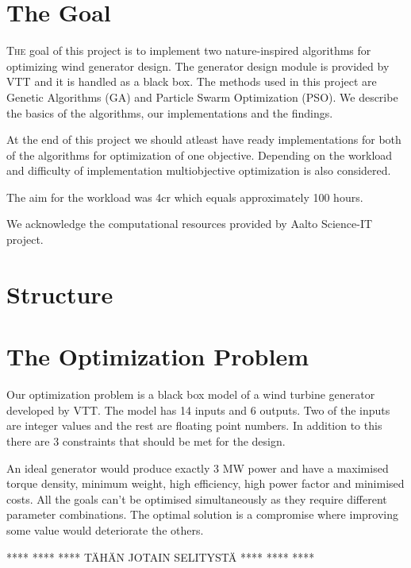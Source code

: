 \documentclass[twoside]{article}
\begin{document}
\begin{multicols}{2} %

\section{The Goal}

\lettrine[nindent=0em,lines=3]{T}{he} goal of this project is to implement two nature-inspired algorithms for optimizing wind generator design. The generator design module is provided by VTT and it is handled as a black box. The methods used in this project are Genetic Algorithms (GA) and Particle Swarm Optimization (PSO). We describe the basics of the algorithms, our implementations and the findings.

At the end of this project we should atleast have ready implementations for both of the algorithms for optimization of one objective. Depending on the workload and difficulty of implementation multiobjective optimization is also considered.

The aim for the workload was 4cr which equals approximately 100 hours.

We acknowledge the computational resources provided by Aalto Science-IT project.





\section{Structure}
\section{The Optimization Problem}
Our optimization problem is a black box model of a wind turbine generator developed by VTT. The model has 14 inputs and 6 outputs. Two of the inputs are integer values and the rest are floating point numbers. In addition to this there are 3 constraints that should be met for the design. 
	
An ideal generator would produce exactly 3 MW power and have a maximised torque density, minimum weight, high efficiency, high power factor and minimised costs. All the goals can't be optimised simultaneously as they require different parameter combinations. The optimal solution is a compromise where improving some value would deteriorate the others.

**** **** **** TÄHÄN JOTAIN SELITYSTÄ **** **** ****


\end{multicols}
\end{document}
